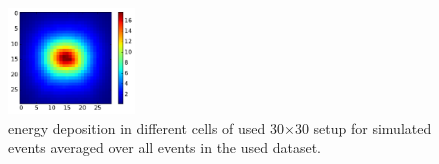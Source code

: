 
\begin{figure}
\begin{center}
\includegraphics[width=0.3\textwidth]{figures/mean_cluster.pdf}
\caption{energy deposition in different cells of used 30$\times $30 setup for \geant simulated events averaged over all events in the used dataset. \label{fig:real-imgs}}
\end{center}
\end{figure}